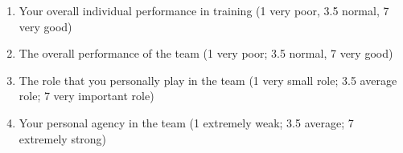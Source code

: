 \begin{CJK}{UTF8}{gbsn}
\begin{enumerate}
\item Your overall individual performance in training (1 very poor, 3.5 normal, 7 very good)
\item The overall performance of the team (1 very poor; 3.5 normal, 7 very good)
\item The role that you personally play in the team (1 very small role; 3.5 average role; 7 very important role)
\item  Your personal agency in the team (1 extremely weak;  3.5 average; 7 extremely strong)
\end{enumerate}

























































































\end{CJK}
